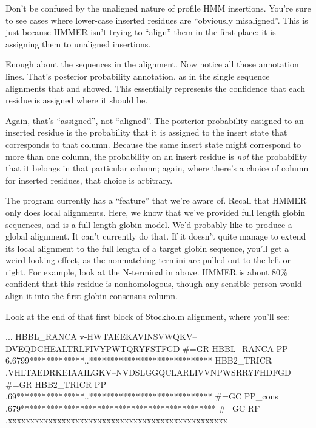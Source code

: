 Don't be confused by the unaligned nature of profile HMM
insertions. You're sure to see cases where lower-case inserted
residues are ``obviously misaligned''.  This is just because HMMER
isn't trying to ``align'' them in the first place: it is assigning
them to unaligned insertions.

Enough about the sequences in the alignment. Now notice all those
 annotation lines. That's posterior probability annotation,
as in the single sequence alignments that  and
 showed. This essentially represents the confidence
that each residue is assigned where it should be. 

Again, that's ``assigned'', not ``aligned''. The posterior probability
assigned to an inserted residue is the probability that it is assigned
to the insert state that corresponds to that column. Because the same
insert state might correspond to more than one column, the probability
on an insert residue is \emph{not} the probability that it belongs in
that particular column; again, where there's a choice of column for
inserted residues, that choice is arbitrary.

The program  currently has a ``feature'' that we're aware
of. Recall that HMMER only does local alignments. Here, we know that
we've provided full length globin sequences, and  is a
full length globin model. We'd probably like  to
produce a global alignment. It can't currently do that. If it doesn't
quite manage to extend its local alignment to the full length of a
target globin sequence, you'll get a weird-looking effect, as the
nonmatching termini are pulled out to the left or right. For example,
look at the N-terminal  in  above. HMMER is
about 80\% confident that this residue is nonhomologous, though any
sensible person would align it into the first globin consensus column.

Look at the end of that first block of Stockholm alignment, where you'll
see:

\begin{samepage}
\begin{sreoutput}
...
HBBL_RANCA         v-HWTAEEKAVINSVWQKV--DVEQDGHEALTRLFIVYPWTQRYFSTFGD
#=GR HBBL_RANCA PP 6.6799*************..*****************************
HBB2_TRICR         .VHLTAEDRKEIAAILGKV--NVDSLGGQCLARLIVVNPWSRRYFHDFGD
#=GR HBB2_TRICR PP .69****************..*****************************
#=GC PP_cons       .679**********************************************
#=GC RF            .xxxxxxxxxxxxxxxxxxxxxxxxxxxxxxxxxxxxxxxxxxxxxxxxx
\end{sreoutput}
\end{samepage}

